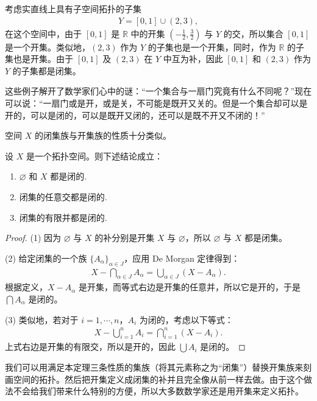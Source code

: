 \documentclass[../../main.tex]{subfiles}
\begin{document}
\begin{example}\label{example:ch02-闭集5}
考虑实直线上具有子空间拓扑的子集
\begin{align*}
Y = [0, 1] \cup (2, 3),
\end{align*}
在这个空间中，由于 $[0, 1]$ 是 $\mathbb{R}$ 中的开集 $\left(-\frac{1}{2}, \frac{3}{2}\right)$ 与 $Y$ 的交，所以集合 $[0, 1]$ 是一个开集。类似地，$(2, 3)$ 作为 $Y$ 的子集也是一个开集，同时，作为 $\mathbb{R}$ 的子集也是开集。由于 $[0, 1]$ 及 $(2, 3)$ 在 $Y$ 中互为补，因此 $[0, 1]$ 和 $(2, 3)$ 作为 $Y$ 的子集都是闭集。
\end{example}

这些例子解开了数学家们心中的谜：“一个集合与一扇门究竟有什么不同呢？”现在可以说：“一扇门或是开，或是关，不可能是既开又关的。但是一个集合却可以是开的，可以是闭的，可以是既开又闭的，还可以是既不开又不闭的！”

空间 $X$ 的闭集族与开集族的性质十分类似。

\begin{theorem}[闭集的性质]\label{theorem:ch02-闭集性质}
设 $X$ 是一个拓扑空间。则下述结论成立：
\begin{enumerate}[(1)]
\item $\varnothing$ 和 $X$ 都是闭的.
\item 闭集的任意交都是闭的.
\item 闭集的有限并都是闭的.
\end{enumerate}
\end{theorem}

\begin{proof}
(1) 因为 $\varnothing$ 与 $X$ 的补分别是开集 $X$ 与 $\varnothing$，所以 $\varnothing$ 与 $X$ 都是闭集。

(2) 给定闭集的一个族 $\{A_{\alpha}\}_{\alpha \in J}$，应用 De Morgan 定律得到：
\begin{align*}
X - \bigcap_{\alpha \in J} A_{\alpha} = \bigcup_{\alpha \in J} (X - A_{\alpha}).
\end{align*}
根据定义，$X - A_{\alpha}$ 是开集，而等式右边是开集的任意并，所以它是开的，于是 $\bigcap A_{\alpha}$ 是闭的。

(3) 类似地，若对于 $i = 1, \cdots, n$，$A_{i}$ 为闭的，考虑以下等式：
\begin{align*}
X - \bigcup_{i=1}^{n} A_{i} = \bigcap_{i=1}^{n} (X - A_{i}).
\end{align*}
上式右边是开集的有限交，所以是开的，因此 $\bigcup A_{i}$ 是闭的。
\end{proof}

我们可以用满足本定理三条性质的集族（将其元素称之为“闭集”）替换开集族来刻画空间的拓扑。然后把开集定义成闭集的补并且完全像从前一样去做。由于这个做法不会给我们带来什么特别的方便，所以大多数数学家还是用开集来定义拓扑。
\end{document}
